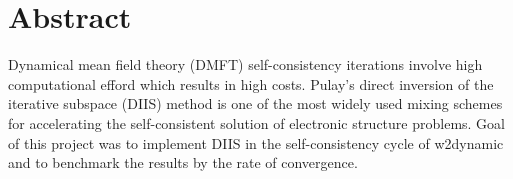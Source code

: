 \chapter*{Abstract}
\label{ch:abstract}

Dynamical mean field theory (DMFT) self-consistency iterations involve high computational efford which results in high costs. Pulay’s direct inversion of the iterative subspace (DIIS) method is one of the most widely used mixing schemes for accelerating the self-consistent solution of electronic structure problems. Goal of this project was to implement DIIS in the self-consistency cycle of w2dynamic and to benchmark the results by the rate of convergence.

